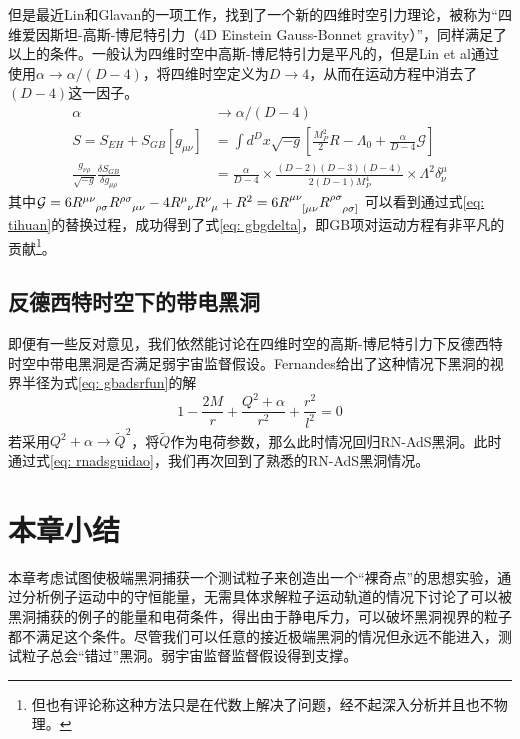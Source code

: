但是最近Lin和Glavan的一项工作，找到了一个新的四维时空引力理论，被称为“四维爱因斯坦-高斯-博尼特引力（4D Einstein Gauss-Bonnet gravity）”，同样满足了以上的条件\citep{glavan2020einstein}。一般认为四维时空中高斯-博尼特引力是平凡的，但是Lin et al通过使用$\alpha\rightarrow \alpha/\left(D-4\right)$，将四维时空定义为$D\rightarrow 4$，从而在运动方程中消去了$\left(D-4\right)$这一因子。
\begin{align}
    \alpha&\rightarrow \alpha/\left(D-4\right) \label{eq: tihuan} \\
    S=S_{EH}+S_{GB}\left[g_{\mu \nu}\right]&=\int d^Dx\sqrt{-g} \left[\frac{M_P^2}{2}R-\Lambda_0+\frac{\alpha}{D-4}\mathcal{G}\right] \\
    \frac{g_{\nu \rho}}{\sqrt{-g}}\frac{\delta S_{GB}}{\delta g_{\mu \rho}}&=\frac{\alpha}{D-4} \times \frac{\left(D-2\right)\left(D-3\right)\left(D-4\right)}{2\left(D-1\right)M_P^4}\times \Lambda^2 \delta^\mu_\nu \label{eq: gbgdelta}
\end{align}
其中$\mathcal{G}=6R\indices{^{\mu \nu}_{\rho \sigma}}R\indices{^{\rho \sigma}_{\mu \nu}}-4R\indices{^{\mu}_{\nu}}R\indices{^{\nu}_{\mu}}+R^2=6R\indices{^{\mu \nu}_{[\mu \nu}}R\indices{^{\rho \sigma}_{\rho \sigma]}}$
可以看到通过式\eqref{eq: tihuan}的替换过程，成功得到了式\eqref{eq: gbgdelta}，即GB项对运动方程有非平凡的贡献\footnote{但也有评论称这种方法只是在代数上解决了问题，经不起深入分析并且也不物理。}。
\subsection{反德西特时空下的带电黑洞}
即便有一些反对意见，我们依然能讨论在四维时空的高斯-博尼特引力下反德西特时空中带电黑洞是否满足弱宇宙监督假设。Fernandes给出了这种情况下黑洞的视界半径为式\eqref{eq: gbadsrfun}的解\citep{fernandes2020charged}
\begin{equation}\label{eq: gbadsrfun}
    1-\frac{2M}{r}+\frac{Q^2+\alpha}{r^2}+\frac{r^2}{l^2}=0
\end{equation}
若采用$Q^2+\alpha \rightarrow \tilde{Q}^2 $，将$\tilde{Q}$作为电荷参数，那么此时情况回归RN-AdS黑洞。此时通过式\eqref{eq: rnadsguidao}，我们再次回到了熟悉的RN-AdS黑洞情况。

\section{本章小结}
本章考虑试图使极端黑洞捕获一个测试粒子来创造出一个“裸奇点”的思想实验，通过分析例子运动中的守恒能量，无需具体求解粒子运动轨道的情况下讨论了可以被黑洞捕获的例子的能量和电荷条件，得出由于静电斥力，可以破坏黑洞视界的粒子都不满足这个条件。尽管我们可以任意的接近极端黑洞的情况但永远不能进入，测试粒子总会“错过”黑洞。弱宇宙监督监督假设得到支撑。


